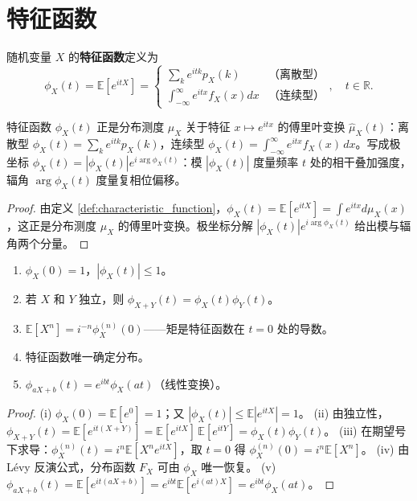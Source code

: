 \section{特征函数}\label{sec:characteristic_function}

\begin{definition}[特征函数]\label{def:characteristic_function}
随机变量 $X$ 的\textbf{特征函数}定义为
\[
\phi_X(t) = \mathbb{E}[e^{itX}] =
\begin{cases}
\sum_k e^{itk} p_X(k) & \text{（离散型）} \\
\int_{-\infty}^{\infty} e^{itx} f_X(x) dx & \text{（连续型）}
\end{cases}, \quad t \in \mathbb{R}.
\]
\end{definition}

\begin{theorem}[特征函数是分布的傅里叶变换]\label{thm:characteristic_fourier}
特征函数 $\phi_X(t)$ 正是分布测度 $\mu_X$ 关于特征 $x \mapsto e^{itx}$ 的傅里叶变换 $\widehat{\mu}_X(t)$：离散型 $\phi_X(t) = \sum_k e^{itk} p_X(k)$，连续型 $\phi_X(t) = \int_{-\infty}^{\infty} e^{itx} f_X(x)\,dx$。写成极坐标 $\phi_X(t) = |\phi_X(t)| e^{i\arg\phi_X(t)}$：模 $|\phi_X(t)|$ 度量频率 $t$ 处的相干叠加强度，辐角 $\arg\phi_X(t)$ 度量复相位偏移。
\end{theorem}

\begin{proof}
由定义 \ref{def:characteristic_function}，$\phi_X(t) = \mathbb{E}[e^{itX}] = \int e^{itx} d\mu_X(x)$，这正是分布测度 $\mu_X$ 的傅里叶变换。极坐标分解 $|\phi_X(t)| e^{i\arg\phi_X(t)}$ 给出模与辐角两个分量。
\end{proof}

\begin{proposition}[特征函数的基本性质]\label{prop:characteristic_function_properties}
\begin{enumerate}[label=(\roman*)]
    \item $\phi_X(0) = 1$，$|\phi_X(t)| \le 1$。
    \item 若 $X$ 和 $Y$ 独立，则 $\phi_{X+Y}(t) = \phi_X(t) \phi_Y(t)$。
    \item $\mathbb{E}[X^n] = i^{-n} \phi_X^{(n)}(0)$——矩是特征函数在 $t=0$ 处的导数。
    \item 特征函数唯一确定分布。
    \item $\phi_{aX+b}(t) = e^{ibt} \phi_X(at)$（线性变换）。
\end{enumerate}
\end{proposition}

\begin{proof}
(i) $\phi_X(0) = \mathbb{E}[e^{0}] = 1$；又 $|\phi_X(t)| \le \mathbb{E}|e^{itX}| = 1$。
(ii) 由独立性，$\phi_{X+Y}(t) = \mathbb{E}[e^{it(X+Y)}] = \mathbb{E}[e^{itX}]\,\mathbb{E}[e^{itY}] = \phi_X(t)\phi_Y(t)$。
(iii) 在期望号下求导：$\phi_X^{(n)}(t) = i^n \mathbb{E}[X^n e^{itX}]$，取 $t = 0$ 得 $\phi_X^{(n)}(0) = i^n \mathbb{E}[X^n]$。
(iv) 由 Lévy 反演公式，分布函数 $F_X$ 可由 $\phi_X$ 唯一恢复。
(v) $\phi_{aX+b}(t) = \mathbb{E}[e^{it(aX+b)}] = e^{ibt} \mathbb{E}[e^{i(at)X}] = e^{ibt} \phi_X(at)$。
\end{proof}

